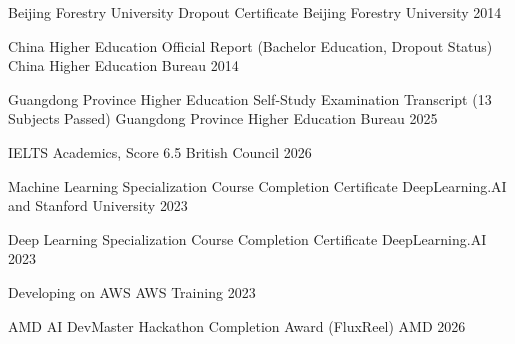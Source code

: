 

\begin{cvhonors}

  \cvhonor
    {Beijing Forestry University Dropout Certificate} %
    {Beijing Forestry University} %
    {} %
    {2014} %

  \cvhonor
    {China Higher Education Official Report (Bachelor Education, Dropout Status)} %
    {China Higher Education Bureau} %
    {} %
    {2014} %

  \cvhonor
    {Guangdong Province Higher Education Self-Study Examination Transcript (13 Subjects Passed)} %
    {Guangdong Province Higher Education Bureau} %
    {} %
    {2025} %

  \cvhonor
    {IELTS Academics, Score 6.5} %
    {British Council} %
    {} %
    {2026} %

  \cvhonor
    {Machine Learning Specialization Course Completion Certificate} %
    {DeepLearning.AI and Stanford University} %
    {} %
    {2023} %

  \cvhonor
    {Deep Learning Specialization Course Completion Certificate} %
    {DeepLearning.AI} %
    {} %
    {2023} %

  \cvhonor
    {Developing on AWS} %
    {AWS Training} %
    {} %
    {2023} %

  \cvhonor
    {AMD AI DevMaster Hackathon Completion Award (FluxReel)} %
    {AMD} %
    {} %
    {2026} %

\end{cvhonors}
